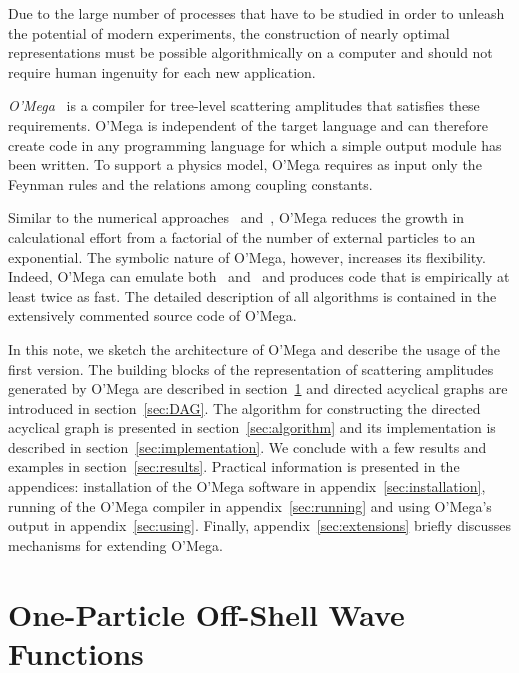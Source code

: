 \documentclass[12pt,a4paper]{article}
\begin{document}
Due to the large number of processes that have to be studied in order
to unleash the potential of modern experiments, the construction of
nearly optimal representations must be possible algorithmically on a
computer and should not require human ingenuity for each new
application.

\textit{O'Mega}~\cite{O'Mega:Ohl} is a compiler for
tree-level scattering amplitudes that satisfies these requirements.
O'Mega is independent of the target language and can therefore create
code in any programming language for which a simple output module has
been written.  To support a physics model, O'Mega requires as input
only the Feynman rules and the relations among coupling constants.

Similar to the numerical approaches~\cite{ALPHA:1997}
and~\cite{HELAC:2000}, O'Mega reduces the growth in calculational
effort from a factorial of the number of external particles to an exponential.
The symbolic nature of O'Mega, however, increases its flexibility.
Indeed, O'Mega can emulate both~\cite{ALPHA:1997}
and~\cite{HELAC:2000} and produces code that is empirically at least
twice as fast.  The detailed description of all algorithms is
contained in the extensively commented source code of
O'Mega.

In this note, we sketch the architecture of O'Mega and describe the
usage of the first version.  The building blocks of the representation
of scattering amplitudes generated by O'Mega are described in
section~\ref{sec:1POW} and directed acyclical graphs are introduced in
section~\ref{sec:DAG}.  The algorithm for constructing the directed
acyclical graph is presented in section~\ref{sec:algorithm} and its
implementation is described in section~\ref{sec:implementation}.
We conclude with a few results and examples in
section~\ref{sec:results}.  Practical information is
presented in the appendices: installation of the O'Mega software in
appendix~\ref{sec:installation}, running of the O'Mega compiler in
appendix~\ref{sec:running} and using O'Mega's output in
appendix~\ref{sec:using}.  Finally, appendix~\ref{sec:extensions}
briefly discusses mechanisms for extending O'Mega.


\section{One-Particle Off-Shell Wave Functions}
\label{sec:1POW}
\end{document}
